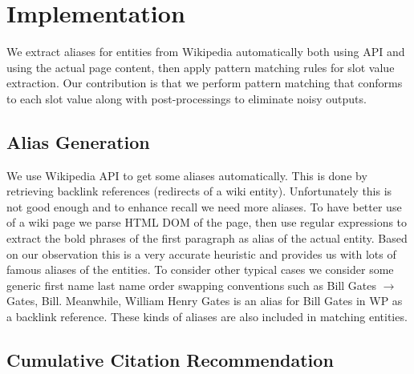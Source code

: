 

\section{Implementation}
\label{section:implementation}

We extract aliases for entities from Wikipedia automatically both using API 
and using the actual page content, then apply pattern matching rules for slot 
value extraction. Our contribution is that we perform pattern matching that conforms to each slot 
value along with post-processings to eliminate noisy outputs. 


\subsection{Alias Generation}
\label{section:aliasgeneration}

We use Wikipedia API to get some aliases automatically. This is done by 
retrieving backlink references (redirects of a wiki entity). Unfortunately 
this is not good enough and to enhance recall we need more aliases. To have 
better use of a wiki page we parse HTML DOM of the page, then use regular 
expressions to extract the bold phrases of the first paragraph as alias of the 
actual entity. Based on our observation this is a very accurate heuristic and 
provides us with lots of famous aliases of the entities. To consider other 
typical cases we consider some generic first name last name order swapping 
conventions such as Bill Gates $\rightarrow$ Gates, Bill.  Meanwhile, William Henry
Gates is an alias for Bill Gates in WP as a backlink reference. These kinds of
aliases are also included in matching entities. 

\subsection{Cumulative Citation Recommendation}
\label{sec:ccrimpl}

